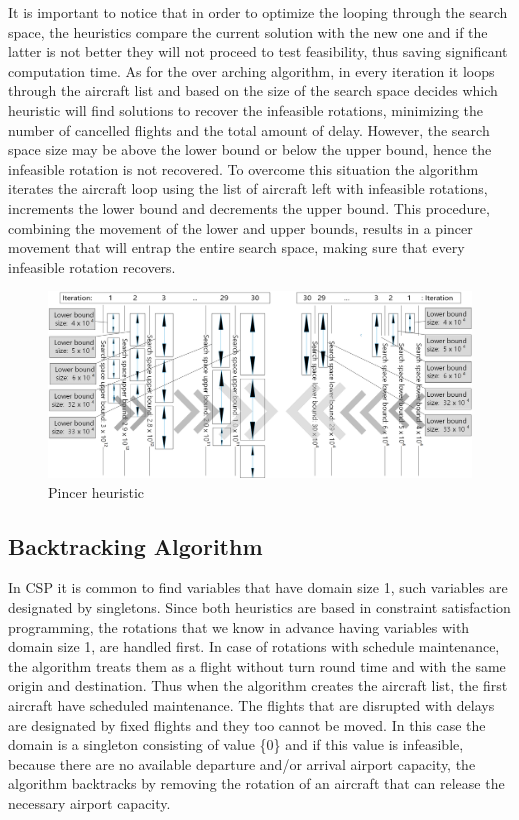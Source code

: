 It is important to notice that in order to optimize the looping through the search space, the heuristics compare the current solution with the new one and if the latter is not better they will not proceed to test feasibility, thus saving significant computation time. 
As for the over arching algorithm, in every iteration it loops through the aircraft list and based on the size of the search space decides which heuristic will find solutions to recover the infeasible rotations, minimizing the number of cancelled flights and the total amount of delay. However, the search space size may be above the lower bound or below the upper bound, hence the infeasible rotation is not recovered. To overcome this situation the algorithm iterates the aircraft loop using the list of aircraft left with infeasible rotations, increments the lower bound %
and decrements the upper bound.%
 This procedure, combining the movement of the lower and upper bounds, results in a pincer movement that will entrap the entire search space, making sure that every infeasible rotation recovers.\\
 
 \begin{figure}[h!]
 	\centering
 	\includegraphics[scale=0.45]{figures/pincer.png}
 	\caption[]{Pincer heuristic}
 	\label{fig:pincer}
 \end{figure}
%
%
\subsection{Backtracking Algorithm} \label{sec:backtracking}

In CSP it is common to find variables that have domain size 1, such variables are designated by singletons. Since both heuristics are based in constraint satisfaction programming, the rotations that we know in advance having variables with domain size 1, are handled first. In case of rotations with schedule maintenance, the algorithm treats them as a flight without turn round time and with the same origin and destination.  Thus when the algorithm creates the aircraft list, the first aircraft have scheduled maintenance. The flights that are disrupted with delays are designated by fixed flights and they too cannot be moved. In this case the domain is a singleton consisting of value \{0\} and if this value is infeasible, because there are no available departure and/or arrival airport capacity, the algorithm backtracks by removing the rotation of an aircraft that can release the necessary airport capacity.

